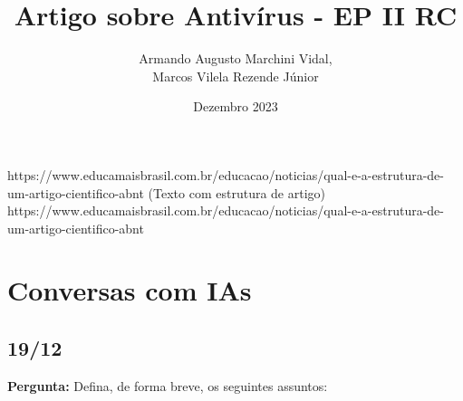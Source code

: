 \documentclass[10pt,conference,twocolumn]{article}
\title{Artigo sobre Antivírus - EP II RC}
\author{Armando Augusto Marchini Vidal,\\
Marcos Vilela Rezende Júnior}
\date{Dezembro 2023}
\begin{document}
https://www.educamaisbrasil.com.br/educacao/noticias/qual-e-a-estrutura-de-um-artigo-cientifico-abnt (Texto com estrutura de artigo)\newline
https://www.educamaisbrasil.com.br/educacao/noticias/qual-e-a-estrutura-de-um-artigo-cientifico-abnt
\newpage
\maketitle

\section{Conversas com IAs}
\subsection{19/12}
\textbf{Pergunta:}\newline
Defina, de forma breve, os seguintes assuntos:
\end{document}
